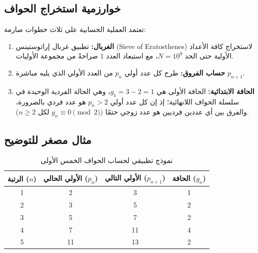 \documentclass[12pt,a4paper]{article}
\begin{document}
\subsection{خوارزمية استخراج الحواف}
تعتمد العملية الحسابية على ثلاث خطوات صارمة:
\begin{enumerate}
    \item \textbf{الغربال:} تطبيق غربال إراتوستينس (\textenglish{Sieve of Eratosthenes}) لاستخراج كافة الأعداد الأولية حتى الحد $N = 10^9$، مع استبعاد العدد $1$ صراحةً من مجموعة الأوليات.
    \item \textbf{حساب الفروق:} طرح كل عدد أولي $p_n$ من العدد الأولي الذي يليه مباشرة $p_{n+1}$.
    \item \textbf{الحافة الابتدائية:} الحافة الأولى هي $g_1 = 3 - 2 = 1$، وهي الحالة الفردية الوحيدة في سلسلة الحواف اللانهائية؛ إذ إن كل عدد أولي $p_n > 2$ هو عدد فردي بالضرورة، والفرق بين أي عددين فرديين هو عدد زوجي حتمًا ($g_n \equiv 0 \pmod 2$ لكل $n \geq 2$).
\end{enumerate}

\subsection{مثال مصغر للتوضيح}
\begin{table}[H]
\centering
\begin{tabular}{cccc}
\toprule
\textbf{الرتبة ($n$)} & \textbf{الأولي الحالي ($p_n$)} & \textbf{الأولي التالي ($p_{n+1}$)} & \textbf{الحافة ($g_n$)} \\
\midrule
1 & 2 & 3 & 1 \\
2 & 3 & 5 & 2 \\
3 & 5 & 7 & 2 \\
4 & 7 & 11 & 4 \\
5 & 11 & 13 & 2 \\
\bottomrule
\end{tabular}
\caption{نموذج تطبيقي لحساب الحواف الخمس الأولى}
\end{table}
\end{document}
